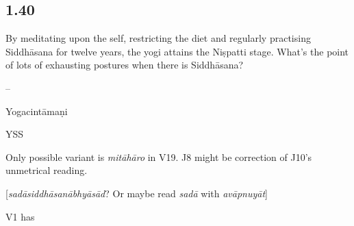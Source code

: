 \begin{ekdosis}
\subsection*{1.40}
\begin{translation}[hp01_040]
By meditating upon the self, restricting the diet and regularly practising Siddhāsana for twelve years, the yogi attains the Niṣpatti stage.
What’s the point of lots of exhausting postures when there is Siddhāsana?
\end{translation}

\begin{sources}[hp01_040]
--
\end{sources}

\begin{testimonia}[hp01_040]
Yogacintāmaṇi

\begin{versinnote}
\end{versinnote}

YSS

\begin{versinnote}
\end{versinnote}

\end{testimonia}

\begin{philcomm}[hp01_040]
Only possible variant is \emph{mitāhāro} in V19.
J8 might be correction of J10’s unmetrical reading.

[\emph{sadāsiddhāsanābhyāsād}? Or maybe read \emph{sadā} with \emph{avāpnuyāt}]

V1 has

\begin{versinnote}
\end{versinnote}


\end{philcomm}
\end{ekdosis}
